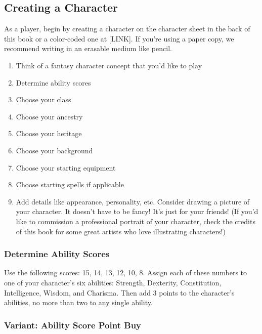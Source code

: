 \subsection{Creating a
Character}\label{Creating_a_Character_creating-a-character}

As a player, begin by creating a character on the character sheet in the
back of this book or a color-coded one at {[}LINK{]}. If you're using a
paper copy, we recommend writing in an erasable medium like pencil.

\begin{enumerate}
\def\labelenumi{\arabic{enumi}.}
\item
  Think of a fantasy character concept that you'd like to play
\item
  Determine ability scores
\item
  Choose your class
\item
  Choose your ancestry
\item
  Choose your heritage
\item
  Choose your background
\item
  Choose your starting equipment
\item
  Choose starting spells if applicable
\item
  Add details like appearance, personality, etc. Consider drawing a
  picture of your character. It doesn't have to be fancy! It's just for
  your friends! (If you'd like to commission a professional portrait of
  your character, check the credits of this book for some great artists
  who love illustrating characters!)
\end{enumerate}

\subsubsection{Determine Ability
Scores}\label{Creating_a_Character_determine-ability-scores}

Use the following scores: 15, 14, 13, 12, 10, 8. Assign each of these
numbers to one of your character's six abilities: Strength, Dexterity,
Constitution, Intelligence, Wisdom, and Charisma. Then add 3 points to
the character's abilities, no more than two to any single ability.

\subsubsection{Variant: Ability Score Point
Buy}\label{Creating_a_Character_variant-ability-score-point-buy}

